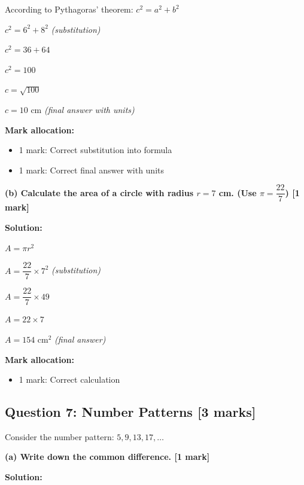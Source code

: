 \documentclass[12pt,a4paper]{article}
\begin{document}
According to Pythagoras' theorem:
$c^2 = a^2 + b^2$

$c^2 = 6^2 + 8^2$ \checkmark \quad \textit{(substitution)}

$c^2 = 36 + 64$

$c^2 = 100$

$c = \sqrt{100}$

$c = 10$ cm \checkmark \quad \textit{(final answer with units)}

\vspace{0.3cm}
\noindent\textbf{Mark allocation:}
\begin{itemize}
    \item 1 mark: Correct substitution into formula
    \item 1 mark: Correct final answer with units
\end{itemize}

\vspace{0.4cm}

\textbf{(b) Calculate the area of a circle with radius $r = 7$ cm. (Use $\pi = \dfrac{22}{7}$) \hfill [1 mark]}

\vspace{0.2cm}
\noindent\textbf{Solution:}

$A = \pi r^2$

$A = \dfrac{22}{7} \times 7^2$ \checkmark \quad \textit{(substitution)}

$A = \dfrac{22}{7} \times 49$

$A = 22 \times 7$

$A = 154$ cm$^2$ \quad \textit{(final answer)}

\vspace{0.3cm}
\noindent\textbf{Mark allocation:}
\begin{itemize}
    \item 1 mark: Correct calculation
\end{itemize}

\subsection*{Question 7: Number Patterns [3 marks]}

\noindent Consider the number pattern: $5, 9, 13, 17, \ldots$

\vspace{0.3cm}

\textbf{(a) Write down the common difference. \hfill [1 mark]}

\vspace{0.2cm}
\noindent\textbf{Solution:}
\end{document}
